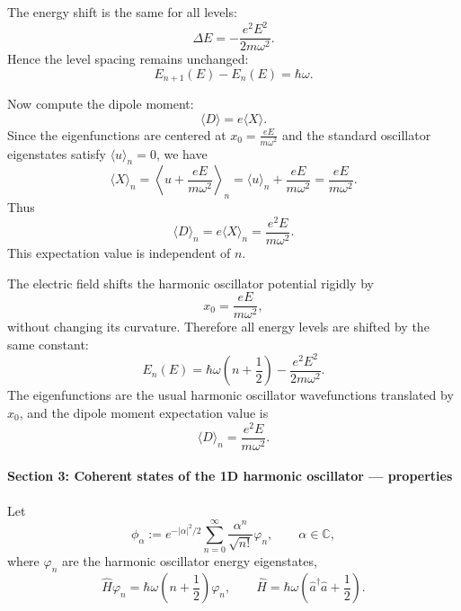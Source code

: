 \documentclass[11pt,a4paper]{scrartcl}
\begin{document}
\begin{enumerate}[label=(\alph*)]
\begin{calculationbox}
    The energy shift is the same for all levels:
    \[
    \Delta E = -\frac{e^2E^2}{2m\omega^2}.
    \]
    Hence the level spacing remains unchanged:
    \[
    E_{n+1}(E)-E_n(E)=\hbar\omega.
    \]

    Now compute the dipole moment:
    \[
    \langle D\rangle = e\langle X\rangle.
    \]
    Since the eigenfunctions are centered at $x_0=\frac{eE}{m\omega^2}$ and the standard oscillator eigenstates satisfy $\langle u\rangle_n=0$, we have
    \[
    \langle X\rangle_n = \left\langle u+\frac{eE}{m\omega^2}\right\rangle_n
    = \langle u\rangle_n + \frac{eE}{m\omega^2}
    = \frac{eE}{m\omega^2}.
    \]
    Thus
    \[
    \boxed{
    \langle D\rangle_n = e\langle X\rangle_n
    = \frac{e^2 E}{m\omega^2}
    }.
    \]
    This expectation value is independent of $n$.
    \end{calculationbox}

    \begin{answerbox}
    The electric field shifts the harmonic oscillator potential rigidly by
    \[
    x_0=\frac{eE}{m\omega^2},
    \]
    without changing its curvature. Therefore all energy levels are shifted by the same constant:
    \[
    \boxed{
    E_n(E)=\hbar\omega\left(n+\frac12\right)-\frac{e^2E^2}{2m\omega^2}.
    }
    \]
    The eigenfunctions are the usual harmonic oscillator wavefunctions translated by $x_0$, and the dipole moment expectation value is
    \[
    \boxed{
    \langle D\rangle_n=\frac{e^2E}{m\omega^2}.
    }
    \]
    \end{answerbox}
\end{enumerate}

\paragraph{Section 3: Coherent states of the 1D harmonic oscillator --- properties}

Let
\[
\phi_\alpha := e^{-|\alpha|^2/2}\sum_{n=0}^{\infty}\frac{\alpha^n}{\sqrt{n!}}\varphi_n,
\qquad \alpha\in\mathbb{C},
\]
where $\varphi_n$ are the harmonic oscillator energy eigenstates,
\[
\hat H\varphi_n=\hbar\omega\left(n+\frac12\right)\varphi_n,
\qquad
\hat H=\hbar\omega\left(\hat a^\dagger \hat a+\frac12\right).
\]
\end{document}
